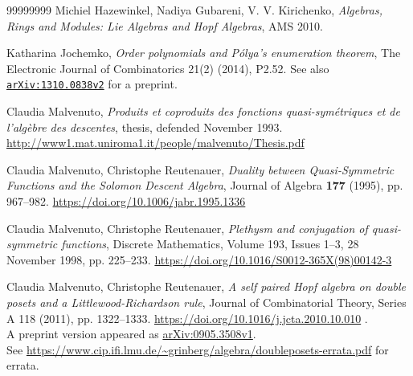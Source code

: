 \documentclass[numbers=enddot,12pt,final,onecolumn,notitlepage,abstracton]{scrartcl}
\theoremstyle{definition}
\begin{document}
\begin{thebibliography}{99999999}
Michiel Hazewinkel, Nadiya Gubareni, V. V. Kirichenko,
\textit{Algebras, Rings and Modules: Lie Algebras and Hopf Algebras},
AMS 2010.


Katharina Jochemko, \textit{Order polynomials and
P\'{o}lya's enumeration theorem},
The Electronic Journal of Combinatorics 21(2) (2014), P2.52.
See also
\texttt{\href{http://arxiv.org/abs/1310.0838v2}{arXiv:1310.0838v2}}
for a preprint.


Claudia Malvenuto, \textit{Produits et
coproduits des fonctions quasi-sym\'{e}triques et de l'alg\`{e}bre des
descentes}, thesis, defended November 1993.\newline
\url{http://www1.mat.uniroma1.it/people/malvenuto/Thesis.pdf}

Claudia Malvenuto, Christophe Reutenauer,
\textit{Duality between Quasi-Symmetric Functions and the Solomon
Descent Algebra},
Journal of Algebra \textbf{177} (1995), pp. 967--982.
\newline\url{https://doi.org/10.1006/jabr.1995.1336}

Claudia Malvenuto, Christophe Reutenauer,
\textit{Plethysm and conjugation of quasi-symmetric functions}, Discrete
Mathematics, Volume 193, Issues 1--3, 28 November 1998, pp.
225--233.\newline
\url{https://doi.org/10.1016/S0012-365X(98)00142-3}

Claudia Malvenuto, Christophe Reutenauer,
\textit{A self paired Hopf algebra on double posets and
a Littlewood-Richardson rule},
Journal of Combinatorial Theory, Series A 118 (2011), pp. 1322--1333.
\newline
\url{https://doi.org/10.1016/j.jcta.2010.10.010} . \\
A preprint version appeared as
\href{http://arxiv.org/abs/0905.3508v1}{arXiv:0905.3508v1}. \\
See \url{https://www.cip.ifi.lmu.de/~grinberg/algebra/doubleposets-errata.pdf}
for errata.


\end{thebibliography}
\end{document}
